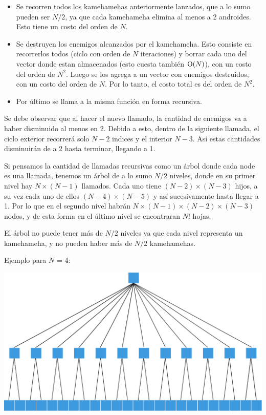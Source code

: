     \begin{itemize}
        \item Se recorren todos los kamehamehas anteriormente lanzados, que a lo sumo pueden ser $N/2$, ya que cada kamehameha elimina al menos a 2 androides. Esto tiene un costo del orden de $N$.
        \item Se destruyen los enemigos alcanzados por el kamehameha. Esto consiste en recorrerlos todos (ciclo con orden de $N$ iteraciones) y borrar cada uno del vector donde estan almacenados (esto cuesta también $\operatorname{O}(N)$), con un costo del orden de $N^2$. Luego se los agrega a un vector con enemigos destruidos, con un costo del orden de $N$. Por lo tanto, el costo total es del orden de $N^2$.
        \item Por último se llama a la misma función en forma recursiva.
    \end{itemize}

    Se debe observar que al hacer el nuevo llamado, la cantidad de enemigos va a haber disminuido al menos en 2. Debido a esto, dentro de la siguiente llamada, el ciclo exterior recorrerá solo $N - 2$ indices y el interior $N - 3$. Así estas cantidades disminuirán de a 2 hasta terminar, llegando a 1.


    Si pensamos la cantidad de llamadas recursivas como un árbol donde cada node es una llamada, tenemos un árbol de a lo sumo $N/2$ niveles, donde en su primer nivel hay $N \times (N - 1)$ llamados. Cada uno tiene $(N - 2) \times (N - 3)$ hijos, a su vez cada uno de ellos $(N - 4) \times (N - 5)$ y así sucesivamente hasta llegar a 1. Por lo que en el segundo nivel habrán $N \times (N - 1) \times (N - 2) \times (N - 3)$ nodos, y de esta forma en el último nivel se encontraran $N!$ hojas.

    El árbol no puede tener más de $N/2$ niveles ya que cada nivel representa un kamehameha, y no pueden haber más de $N/2$ kamehamehas.

    Ejemplo para $N$ = 4: 

    \begin{center}
    \includegraphics[width=0.6\columnwidth]{imagenes/ej3_arbol.pdf}
    \end{center}
    
